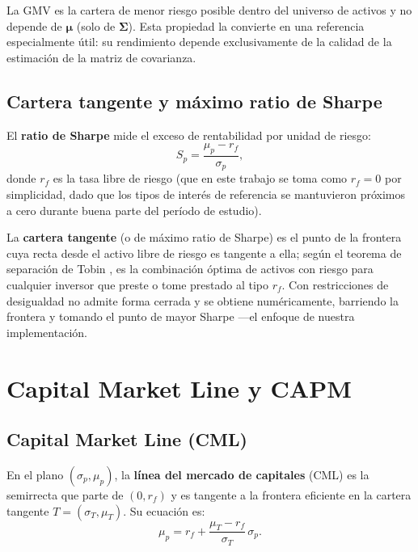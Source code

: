 La GMV es la cartera de menor riesgo posible dentro del universo de
activos y no depende de $\boldsymbol{\mu}$ (solo de $\boldsymbol{\Sigma}$).
Esta propiedad la convierte en una referencia especialmente útil: su
rendimiento depende exclusivamente de la calidad de la estimación de la
matriz de covarianza.

\subsection{Cartera tangente y máximo ratio de Sharpe}

El \textbf{ratio de Sharpe} \cite{Sharpe1966} mide el exceso de
rentabilidad por unidad de riesgo:
\begin{equation}
    S_p = \frac{\mu_p - r_f}{\sigma_p},
    \label{eq:sharpe}
\end{equation}
donde $r_f$ es la tasa libre de riesgo (que en este trabajo se toma como
$r_f = 0$ por simplicidad, dado que los tipos de interés de referencia se
mantuvieron próximos a cero durante buena parte del período de estudio).

La \textbf{cartera tangente} (o de máximo ratio de Sharpe) es el punto de la
frontera cuya recta desde el activo libre de riesgo es tangente a ella; según el
teorema de separación de Tobin \cite{Tobin1958}, es la combinación óptima de
activos con riesgo para cualquier inversor que preste o tome prestado al tipo
$r_f$. Con restricciones de desigualdad no admite forma cerrada y se obtiene
numéricamente, barriendo la frontera y tomando el punto de mayor Sharpe ---el
enfoque de nuestra implementación.

\section{Capital Market Line y CAPM}

\subsection{Capital Market Line (CML)}

En el plano $(\sigma_p, \mu_p)$, la \textbf{línea del mercado de capitales}
(CML) es la semirrecta que parte de $(0, r_f)$ y es tangente a la frontera
eficiente en la cartera tangente $T = (\sigma_T, \mu_T)$. Su ecuación es:
\begin{equation}
    \mu_p = r_f + \frac{\mu_T - r_f}{\sigma_T} \, \sigma_p.
    \label{eq:cml}
\end{equation}

